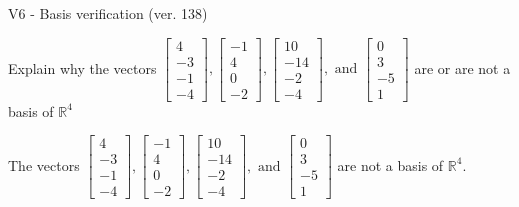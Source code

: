 \begin{exercise}
  \begin{exerciseTitle}V6 - Basis verification (ver. 138)\end{exerciseTitle}
  \begin{exerciseStatement}
    Explain why the vectors \(\left[\begin{array}{r}
4 \\
-3 \\
-1 \\
-4
\end{array}\right] , \left[\begin{array}{r}
-1 \\
4 \\
0 \\
-2
\end{array}\right] , \left[\begin{array}{r}
10 \\
-14 \\
-2 \\
-4
\end{array}\right] , \text{ and } \left[\begin{array}{r}
0 \\
3 \\
-5 \\
1
\end{array}\right]\) are or are not a basis of \(\mathbb{R}^4\)	


  \end{exerciseStatement}
  \begin{exerciseAnswer}
   The vectors \(\left[\begin{array}{r}
4 \\
-3 \\
-1 \\
-4
\end{array}\right] , \left[\begin{array}{r}
-1 \\
4 \\
0 \\
-2
\end{array}\right] , \left[\begin{array}{r}
10 \\
-14 \\
-2 \\
-4
\end{array}\right] , \text{ and } \left[\begin{array}{r}
0 \\
3 \\
-5 \\
1
\end{array}\right]\) 
  	 are not  a basis of \(\mathbb{R}^4\).
  


  \end{exerciseAnswer}
\end{exercise}